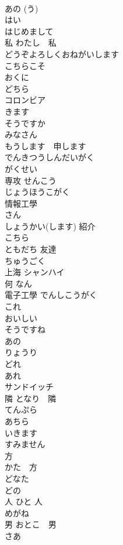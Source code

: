 \documentclass[8pt]{extreport}
\begin{document}
\begin{CJK}{UTF8}{min}
\\	あの (う)
\\	はい
\\	はじめまして
\\	私	わたし　私
\\	どうぞよろしくおねがいします
\\	こちらこそ
\\	おくに
\\	どちら
\\	コロンビア 
\\	きます
\\	そうですか
\\	みなさん
\\	もうします　申します　
\\	でんきつうしんだいがく 
\\	がくせい
\\	専攻	せんこう　
\\	じょうほうこがく 　
\\	情報工學
\\	さん
\\	しょうかい(します) 紹介
\\	こちら
\\	ともだち 友達
\\	ちゅうごく
\\	上海	シャンハイ 
\\	何	なん
\\	電子工學	でんしこうがく
\\	これ
\\	おいしい
\\	そうですね
\\	あの
\\	りょうり
\\	どれ
\\	あれ
\\	サンドイッチ　
\\	隣	となり　隣
\\	てんぷら
\\	あちら
\\	いきます
\\	すみません
\\	方　
\\	かた　方
\\	どなた
\\	どの
\\	人	ひと 人
\\	めがね
\\	男	おとこ　男
\\	さあ

\end{CJK}
\end{document}
